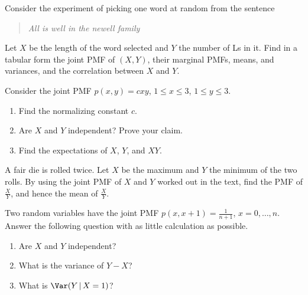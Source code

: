 \begin{problem}[Handout 15, \# 10]
  Consider the experiment of picking one word at random from the sentence
  \begin{quote}
    \textsl{All is well in the newell family}
  \end{quote}
  Let \(X\) be the length of the word selected and \(Y\) the number of Ls
  in it. Find in a tabular form the joint PMF of \((X,Y)\), their marginal
  PMFs, means, and variances, and the correlation between \(X\) and \(Y\).
\end{problem}
\begin{solution}

\end{solution}
\newpage

\begin{problem}[Handout 15, \# 11]
  Consider the joint PMF \(p(x,y)=cxy\), \(1\leq x\leq 3\), \(1\leq y\leq
  3\).
  \begin{enumerate}[label=(\alph*),noitemsep]
  \item Find the normalizing constant \(c\).
  \item Are \(X\) and \(Y\) independent? Prove your claim.
  \item Find the expectations of \(X\), \(Y\), and \(XY\).
  \end{enumerate}
\end{problem}
\begin{solution}

\end{solution}
\newpage

\begin{problem}[Handout 15, \# 12]
  A fair die is rolled twice. Let \(X\) be the maximum and \(Y\) the
  minimum of the two rolls. By using the joint PMF of \(X\) and \(Y\)
  worked out in the text, find the PMF of \(\frac{X}{Y}\), and hence the
  mean of \(\frac{X}{Y}\).
\end{problem}
\begin{solution}

\end{solution}
\newpage

\begin{problem}[Handout 15, \# 13]
  Two random variables have the joint PMF \(p(x,x+1)=\frac{1}{n+1}\),
  \(x=0,\dotsc,n\). Answer the following question with as little
  calculation as possible.
  \begin{enumerate}[label=(\alph*),noitemsep]
  \item Are \(X\) and \(Y\) independent?
  \item What is the variance of \(Y-X\)?
  \item What is \(\Var(Y\,|\,{X=1})\)?
  \end{enumerate}
\end{problem}
\begin{solution}

\end{solution}
\newpage

